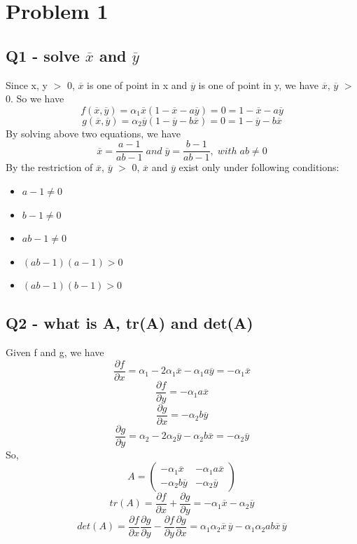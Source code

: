 \documentclass [12pt] {article}
\begin{document}
	\section {Problem 1}
	\subsection {Q1 - solve $\overline{x}$ and $\overline{y}$}
	Since x, y $>$ 0, $\overline{x}$ is one of point in x and $\overline{y}$ is one of point in y, we have $\overline{x}$, $\overline{y}$ $>$ 0. So we have
	\[f(\overline{x}, \overline{y}) = \alpha_1\overline{x}(1-\overline{x}-a\overline{y})=0=1-\overline{x}-a\overline{y}\]
	\[g(\overline{x}, \overline{y}) = \alpha_2\overline{y}(1-\overline{y}-b\overline{x})=0=1-\overline{y}-b\overline{x}\]
	By solving above two equations, we have
	\[\overline{x} = \frac{a-1}{ab-1} \;and \;\overline{y} = \frac{b-1}{ab-1}, \;with \;ab\neq 0\]
	By the restriction of $\overline{x}$, $\overline{y}$ $>$ 0, $\overline{x}$ and $\overline{y}$ exist only under following conditions:
	\begin {itemize}
		\item $a-1 \neq 0$
		\item $b-1 \neq 0$
		\item $ab-1 \neq 0$
		\item $(ab-1)(a-1) > 0$
		\item $(ab-1)(b-1) > 0$
	\end {itemize}
	\subsection {Q2 - what is A, tr(A) and det(A)}
	Given f and g, we have
	\[\frac{\partial f}{\partial x} = \alpha_1 - 2\alpha_1\overline{x}-\alpha_1a\overline{y} = -\alpha_1\overline{x}\]
	\[\frac{\partial f}{\partial y} = -\alpha_1a\overline{x}\]
	\[\frac{\partial g}{\partial x} = -\alpha_2b\overline{y}\]
	\[\frac{\partial g}{\partial y} = \alpha_2 - 2\alpha_2\overline{y}-\alpha_2b\overline{x} = -\alpha_2\overline{y}\]
	So,
	\[A = \left( \begin{array}{cc} -\alpha_1\overline{x} & -\alpha_1a\overline{x} \\ -\alpha_2b\overline{y} & -\alpha_2\overline{y}\end{array} \right)\]
	\[tr(A) = \frac{\partial f}{\partial x} + \frac{\partial g}{\partial y} = -\alpha_1\overline{x} - \alpha_2\overline{y}\]
	\[det(A) = \frac{\partial f}{\partial x}\frac{\partial g}{\partial y} - \frac{\partial f}{\partial y}\frac{\partial g}{\partial x} = \alpha_1\alpha_2\overline{x}\,\overline{y} - \alpha_1\alpha_2ab\overline{x}\,\overline{y}\]
\end{document}
